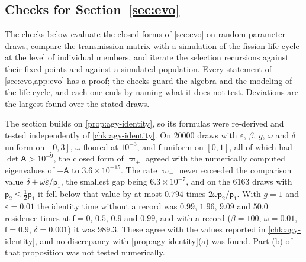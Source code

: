 \subsection{Checks for \texorpdfstring{Section~\ref{sec:evo}}{evolutionary individuality}}\label{chk:evo}

The checks below evaluate the closed forms of \cref{sec:evo} on random parameter draws, compare the transmission matrix with a simulation of the fission life cycle at the level of individual members, and iterate the selection recursions against their fixed points and against a simulated population. Every statement of \cref{sec:evo,app:evo} has a proof; the checks guard the algebra and the modeling of the life cycle, and each one ends by naming what it does not test. Deviations are the largest found over the stated draws.

\begin{numcheck}\label{chk:evo-identity}
The section builds on \cref{prop:agy-identity}, so its formulas were re-derived and tested independently of \cref{chk:agy-identity}. On 20000 draws with $\varepsilon$, $\beta$, $g$, $\omega$ and $\delta$ uniform on $[0,3]$, $\omega$ floored at $10^{-3}$, and $\mathsf f$ uniform on $[0,1]$, all of which had $\det\mathsf A>10^{-9}$, the closed form of $\varpi_\pm$ agreed with the numerically computed eigenvalues of $-\mathsf A$ to $3.6\times10^{-15}$. The rate $\varpi_-$ never exceeded the comparison value $\delta+\omega\tilde\varepsilon/\mathsf p_1$, the smallest gap being $6.3\times10^{-7}$, and on the 6163 draws with $\mathsf p_2\le\frac12\mathsf p_1$ it fell below that value by at most $0.794$ times $2\omega\mathsf p_2/\mathsf p_1$. With $g=1$ and $\varepsilon=0.01$ the identity time without a record was $0.99$, $1.96$, $9.09$ and $50.0$ residence times at $\mathsf f=0$, $0.5$, $0.9$ and $0.99$, and with a record ($\beta=100$, $\omega=0.01$, $\mathsf f=0.9$, $\delta=0.001$) it was $989.3$. These agree with the values reported in \cref{chk:agy-identity}, and no discrepancy with \cref{prop:agy-identity}(a) was found. Part (b) of that proposition was not tested numerically.
\end{numcheck}

